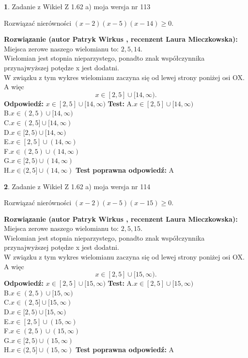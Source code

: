 \documentclass[12pt, a4paper]{article}
\theoremstyle{definition} %
\newtheorem{zad}{}
\newcommand{\zadStart}[1]{\begin{zad}#1\newline}
\newcommand{\zadStop}{\end{zad}}
\newcommand{\rozwStart}[2]{\noindent \textbf{Rozwiązanie (autor #1 , recenzent #2): }\newline}
\newcommand{\rozwStop}{\newline}
\newcommand{\odpStart}{\noindent \textbf{Odpowiedź:}\newline}
\newcommand{\odpStop}{\newline}
\newcommand{\testStart}{\noindent \textbf{Test:}\newline}
\newcommand{\testStop}{\newline}
\newcommand{\kluczStart}{\noindent \textbf{Test poprawna odpowiedź:}\newline}
\newcommand{\kluczStop}{\newline}
\begin{document}
\zadStart{Zadanie z Wikieł Z 1.62 a) moja wersja nr 113}

Rozwiązać nierówności $(x-2)(x-5)(x-14)\ge0$.
\zadStop
\rozwStart{Patryk Wirkus}{Laura Mieczkowska}
Miejsca zerowe naszego wielomianu to: $2, 5, 14$.\\
Wielomian jest stopnia nieparzystego, ponadto znak współczynnika przy\linebreak najwyższej potędze x jest dodatni.\\ W związku z tym wykres wielomianu zaczyna się od lewej strony poniżej osi OX. A więc $$x \in [2,5] \cup [14,\infty).$$
\rozwStop
\odpStart
$x \in [2,5] \cup [14,\infty)$
\odpStop
\testStart
A.$x \in [2,5] \cup [14,\infty)$\\
B.$x \in (2,5) \cup [14,\infty)$\\
C.$x \in (2,5] \cup [14,\infty)$\\
D.$x \in [2,5) \cup [14,\infty)$\\
E.$x \in [2,5] \cup (14,\infty)$\\
F.$x \in (2,5) \cup (14,\infty)$\\
G.$x \in [2,5) \cup (14,\infty)$\\
H.$x \in (2,5] \cup (14,\infty)$
\testStop
\kluczStart
A
\kluczStop



\zadStart{Zadanie z Wikieł Z 1.62 a) moja wersja nr 114}

Rozwiązać nierówności $(x-2)(x-5)(x-15)\ge0$.
\zadStop
\rozwStart{Patryk Wirkus}{Laura Mieczkowska}
Miejsca zerowe naszego wielomianu to: $2, 5, 15$.\\
Wielomian jest stopnia nieparzystego, ponadto znak współczynnika przy\linebreak najwyższej potędze x jest dodatni.\\ W związku z tym wykres wielomianu zaczyna się od lewej strony poniżej osi OX. A więc $$x \in [2,5] \cup [15,\infty).$$
\rozwStop
\odpStart
$x \in [2,5] \cup [15,\infty)$
\odpStop
\testStart
A.$x \in [2,5] \cup [15,\infty)$\\
B.$x \in (2,5) \cup [15,\infty)$\\
C.$x \in (2,5] \cup [15,\infty)$\\
D.$x \in [2,5) \cup [15,\infty)$\\
E.$x \in [2,5] \cup (15,\infty)$\\
F.$x \in (2,5) \cup (15,\infty)$\\
G.$x \in [2,5) \cup (15,\infty)$\\
H.$x \in (2,5] \cup (15,\infty)$
\testStop
\kluczStart
A
\kluczStop
\end{document}
